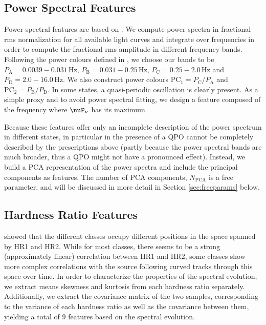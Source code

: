 \documentclass[12pt]{emulateapj}
\begin{document}
\subsection{Power Spectral Features}

Power spectral features are based on \citep{heil2015}. We compute power spectra in fractional rms normalization for all available light curves and integrate over frequencies in order to compute the fractional rms amplitude in different frequency bands. 
Following the power colours defined in \citet{heil2015}, we choose our bands to be $P_\mathrm{A} = 0.0039-0.031 \,\mathrm{Hz}$, 
$P_\mathrm{B} = 0.031-0.25 \,\mathrm{Hz}$, $P_\mathrm{C} =  0.25-2.0 \,\mathrm{Hz}$ and $P_\mathrm{D} = 2.0-16.0 \,\mathrm{Hz}$. We also construct power colours $\mathrm{PC}_1 = P_\mathrm{C}/P_\mathrm{A}$ and  $\mathrm{PC}_2 = P_\mathrm{B}/P_\mathrm{D}$.
In some states, a quasi-periodic oscillation is clearly present. As a simple proxy and to avoid power spectral fitting, we design a feature composed of the frequency where $\nuP_\nu$ has its maximum. 

Because these features offer only an incomplete description of the power spectrum in different states, in particular in the presence of a QPO cannot be completely described by the prescriptions above (partly because the power spectral bands are much broader, thus a QPO might not have a pronounced effect). Instead, we build a PCA representation of the power spectra and include the principal components as features. The number of PCA components, $N_\mathrm{PCA}$ is a free parameter, and will be discussed in more detail in Section \ref{sec:freeparams} below. 

\subsection{Hardness Ratio Features}

\citet{belloni2000} showed that the different classes occupy different positions in the space spanned by HR1 and HR2. While for most classes, there seems to be a strong (approximately linear) correlation between HR1 and HR2, some classes show more complex correlations with the source following curved tracks through this space over time. In order to characterize the properties of the spectral evolution, we extract means skewness and kurtosis from each hardness ratio separately. Additionally, we extract the covariance matrix of the two samples, corresponding to the variance of each hardness ratio as well as the covariance between them, yielding a total of $9$ features based on the spectral evolution.
\end{document}
